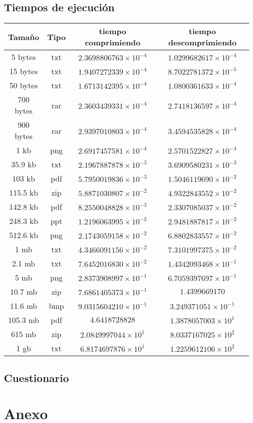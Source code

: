 \documentclass[12 pt]{report}
\begin{document}
\section{Tiempos de ejecución}
\begin{tabular}{ || c c | c | c || }
  \hline
  Tamaño & Tipo & tiempo comprimiendo & tiempo descomprimiendo  \\[0.5ex]
  \hline \hline
  5 bytes & txt & $2.3698806763\times10^{-4}$ & $1.0299682617\times10^{-4}$\\
  15 bytes & txt & $1.9407272339\times10^{-4}$ & $8.7022781372\times10^{-5}$\\
  50 bytes & txt & $1.6713142395\times10^{-4}$ & $1.0800361633\times10^{-4}$\\
  700 bytes & rar & $2.3603439331\times10^{-4}$ & $2.7418136597\times10^{-4}$\\
  900 bytes & rar & $2.9397010803\times10^{-4}$ & $3.4594535828\times10^{-4}$\\
  1 kb & png & $2.6917457581\times10^{-4}$ & $2.5701522827\times10^{-4}$\\
  35.9 kb & txt & $2.1967887878\times10^{-3}$ & $3.6909580231\times10^{-3}$\\
  103 kb & pdf & $5.7950019836\times10^{-3}$ & $1.5046119690\times10^{-2}$\\
  115.5 kb & zip & $ 5.8871030807\times10^{-2}$ & $4.9322843552\times10^{-2}$\\
  142.8 kb & pdf & $8.2550048828\times10^{-3}$ & $2.3307085037\times10^{-2}$\\
  248.3 kb & ppt & $1.2196063995\times10^{-2}$ & $2.9481887817\times10^{-2}$\\
  512.6 kb & png & $2.1743059158\times10^{-2}$ & $6.8802833557\times10^{-2}$\\
  1 mb & txt &  $4.3466091156\times10^{-2}$ & $7.3101997375\times10^{-2}$\\
  2.1 mb & txt & $7.6452016830\times10^{-2}$ & $1.4342093468\times10^{-1}$\\
  5 mb & png & $2.8373908997\times10^{-1}$ & $6.7059397697\times10^{-1}$\\
  10.7 mb & zip & $7.6861405373\times10^{-1}$ & $1.4399669170$\\
  11.6 mb & bmp & $9.0315604210\times10^{-1}$ & $3.249371051\times10^{-1}$\\
  105.3 mb & pdf & $4.6418728828$ & $1.3878057003\times10^{1}$\\
  615 mb & zip &  $2.0849997044\times10^{1}$ & $8.0337167025\times10^{2}$ \\
  1 gb & txt & $6.8174697876\times10^{1}$ & $1.2259612106\times10^{2}$ \\
  [1ex]
  \hline
\end{tabular}



\section{Cuestionario}

\chapter{Anexo}
\end{document}
